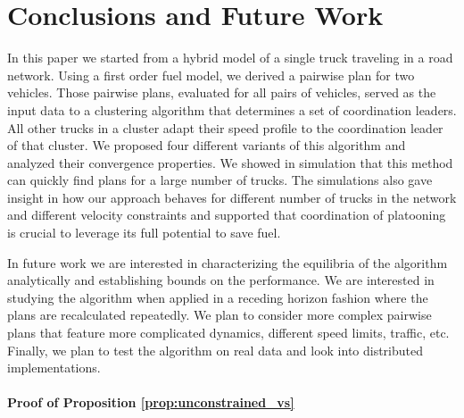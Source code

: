 \documentclass[letterpaper,10pt,conference,twocolumn]{IEEEtran}
\theoremstyle{definition}
\begin{document}
\section{Conclusions and Future Work}

In this paper we started from a hybrid model of a single truck traveling in a road network. Using a first order fuel model, we derived a pairwise plan for two vehicles. Those pairwise plans, evaluated for all pairs of vehicles, served as the input data to a clustering algorithm that determines a set of coordination leaders. All other trucks in a cluster adapt their speed profile to the coordination leader of that cluster. We proposed four different variants of this algorithm and analyzed their convergence properties. We showed in simulation that this method can quickly find plans for a large number of trucks. The simulations also gave insight in how our approach behaves for different number of trucks in the network and different velocity constraints and supported that coordination of platooning is crucial to leverage its full potential to save fuel.

In future work we are interested in characterizing the equilibria of the algorithm analytically and establishing bounds on the performance. We are interested in studying the algorithm when applied in a receding horizon fashion where the plans are recalculated repeatedly. We plan to consider more complex pairwise plans that feature more complicated dynamics, different speed limits, traffic, etc. Finally, we plan to test the algorithm on real data and look into distributed implementations.

\appendix 

\paragraph*{Proof of Proposition \ref{prop:unconstrained_vs}}
\end{document}

